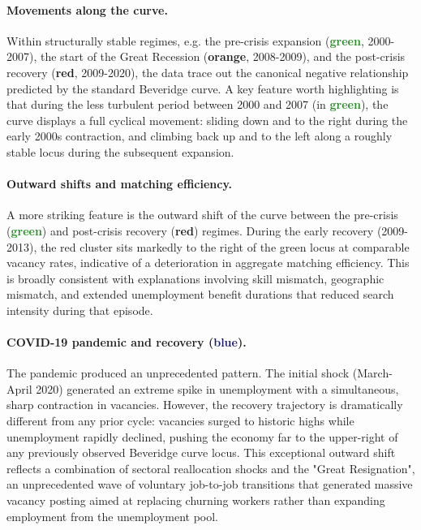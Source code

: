 \documentclass[dvipsnames,11pt]{article}
\begin{document}
\begin{enumerate}
\begin{solution}
                    \paragraph{Movements along the curve.}

                        Within structurally stable regimes, e.g. the pre-crisis expansion (\textcolor{ForestGreen}{\textbf{green}}, 2000-2007), the start of the Great Recession (\textcolor{Dandelion}{\textbf{orange}}, 2008-2009), and the post-crisis recovery (\textcolor{BrickRed}{\textbf{red}}, 2009-2020), the data trace out the canonical negative relationship predicted by the standard Beveridge curve. A key feature worth highlighting is that during the less turbulent period between 2000 and 2007 (in \textcolor{ForestGreen}{\textbf{green}}), the curve displays a full cyclical movement: sliding down and to the right during the early 2000s contraction, and climbing back up and to the left along a roughly stable locus during the subsequent expansion.

                    \paragraph{Outward shifts and matching efficiency.}

                        A more striking feature is the outward shift of the curve between the pre-crisis (\textcolor{ForestGreen}{\textbf{green}}) and post-crisis recovery (\textcolor{BrickRed}{\textbf{red}}) regimes. During the early recovery (2009-2013), the red cluster sits markedly to the right of the green locus at comparable vacancy rates, indicative of a deterioration in aggregate matching efficiency. This is broadly consistent with explanations involving skill mismatch, geographic mismatch, and extended unemployment benefit durations that reduced search intensity during that episode.

                    \paragraph{COVID-19 pandemic and recovery (\textcolor{MidnightBlue}{blue}).}

                        The pandemic produced an unprecedented pattern. The initial shock (March-April 2020) generated an extreme spike in unemployment with a simultaneous, sharp contraction in vacancies. However, the recovery trajectory is dramatically different from any prior cycle: vacancies surged to historic highs while unemployment rapidly declined, pushing the economy far to the upper-right of any previously observed Beveridge curve locus. This exceptional outward shift reflects a combination of sectoral reallocation shocks and the "Great Resignation", an unprecedented wave of voluntary job-to-job transitions that generated massive vacancy posting aimed at replacing churning workers rather than expanding employment from the unemployment pool.


\end{solution}
\end{enumerate}
\end{document}
